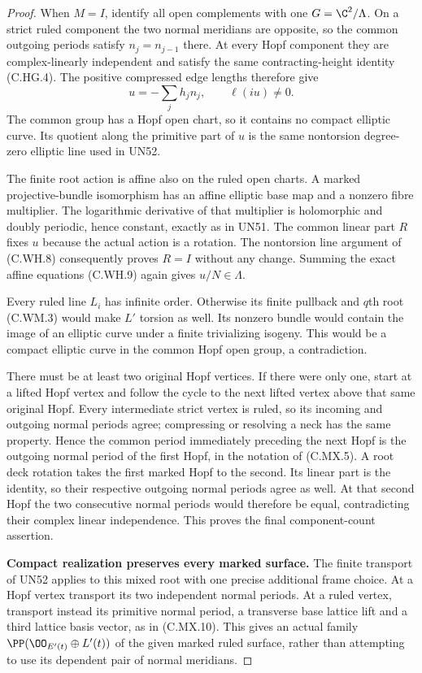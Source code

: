 \begin{proof}
When $M=I$, identify all open complements
with one $G=\C^2/\Lambda$.
On a strict ruled component the two
normal meridians are opposite, so
the common outgoing periods satisfy
$n_j=n_{j-1}$ there. At every Hopf
component they are complex-linearly
independent and satisfy the same
contracting-height identity (C.HG.4).
The positive compressed edge lengths
therefore give
\[
                  u=-\sum_j h_j n_j,\qquad \ell(iu)\ne0.
\tag{C.WM.9}
\]
The common group has a Hopf open chart,
so it contains no compact elliptic curve.
Its quotient along the primitive part
of $u$ is the same nontorsion degree-zero
elliptic line used in UN52.

The finite root action is affine also
on the ruled open charts. A marked
projective-bundle isomorphism has an
affine elliptic base map and a
nonzero fibre multiplier. The logarithmic
derivative of that multiplier is
holomorphic and doubly periodic,
hence constant, exactly as in UN51.
The common linear part $R$ fixes $u$
because the actual action is a
rotation. The nontorsion line argument
of (C.WH.8) consequently proves
$R=I$ without any change.
Summing the exact affine equations
(C.WH.9) again gives
$u/N\in\Lambda$.

Every ruled line $L_i$ has infinite
order. Otherwise its finite pullback
and $q$th root (C.WM.3) would make
$L'$ torsion as well. Its nonzero
bundle would contain the image of
an elliptic curve under a finite
trivializing isogeny. This would be
a compact elliptic curve in the
common Hopf open group, a contradiction.

There must be at least two original
Hopf vertices. If there were only one,
start at a lifted Hopf vertex and
follow the cycle to the next lifted
vertex above that same original Hopf.
Every intermediate strict vertex is
ruled, so its incoming and outgoing
normal periods agree; compressing
or resolving a neck has the same
property. Hence the common period
immediately preceding the next Hopf
is the outgoing normal period of
the first Hopf, in the notation of
(C.MX.5). A root deck rotation takes
the first marked Hopf to the second.
Its linear part is the identity,
so their respective outgoing normal
periods agree as well. At that
second Hopf the two consecutive
normal periods would therefore be
equal, contradicting their complex
linear independence. This proves
the final component-count assertion.

\par\medskip\noindent\textbf{Compact realization preserves every marked surface.}
The finite transport of UN52 applies
to this mixed root with one precise
additional frame choice. At a Hopf
vertex transport its two independent
normal periods. At a ruled vertex,
transport instead its primitive
normal period, a transverse base
lattice lift and a third lattice
basis vector, as in (C.MX.10).
This gives an actual family
$\PP(\OO_{E'(t)}\oplus L'(t))$
of the given marked ruled surface,
rather than attempting to use its
dependent pair of normal meridians.


\end{proof}
